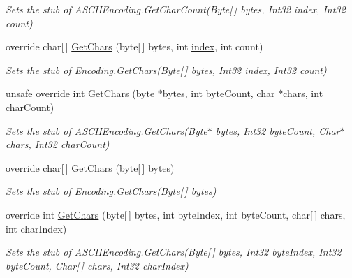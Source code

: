 \begin{DoxyCompactItemize}
\begin{DoxyCompactList}\small\item\em Sets the stub of A\-S\-C\-I\-I\-Encoding.\-Get\-Char\-Count(\-Byte\mbox{[}$\,$\mbox{]} bytes, Int32 index, Int32 count)\end{DoxyCompactList}\item 
override char\mbox{[}$\,$\mbox{]} \hyperlink{class_system_1_1_text_1_1_fakes_1_1_stub_a_s_c_i_i_encoding_a98cc00464ba92346738497208e3e0ed8}{Get\-Chars} (byte\mbox{[}$\,$\mbox{]} bytes, int \hyperlink{jquery-1_810_82-vsdoc_8js_a75bb12d1f23302a9eea93a6d89d0193e}{index}, int count)
\begin{DoxyCompactList}\small\item\em Sets the stub of Encoding.\-Get\-Chars(\-Byte\mbox{[}$\,$\mbox{]} bytes, Int32 index, Int32 count)\end{DoxyCompactList}\item 
unsafe override int \hyperlink{class_system_1_1_text_1_1_fakes_1_1_stub_a_s_c_i_i_encoding_af8360093a4fabc8ceb042e70e77e7f10}{Get\-Chars} (byte $\ast$bytes, int byte\-Count, char $\ast$chars, int char\-Count)
\begin{DoxyCompactList}\small\item\em Sets the stub of A\-S\-C\-I\-I\-Encoding.\-Get\-Chars(\-Byte$\ast$ bytes, Int32 byte\-Count, Char$\ast$ chars, Int32 char\-Count)\end{DoxyCompactList}\item 
override char\mbox{[}$\,$\mbox{]} \hyperlink{class_system_1_1_text_1_1_fakes_1_1_stub_a_s_c_i_i_encoding_ad7f01f405bfa9421b11be2ba091a03ef}{Get\-Chars} (byte\mbox{[}$\,$\mbox{]} bytes)
\begin{DoxyCompactList}\small\item\em Sets the stub of Encoding.\-Get\-Chars(\-Byte\mbox{[}$\,$\mbox{]} bytes)\end{DoxyCompactList}\item 
override int \hyperlink{class_system_1_1_text_1_1_fakes_1_1_stub_a_s_c_i_i_encoding_a7244f25452db59d6ad7d08fe55f73181}{Get\-Chars} (byte\mbox{[}$\,$\mbox{]} bytes, int byte\-Index, int byte\-Count, char\mbox{[}$\,$\mbox{]} chars, int char\-Index)
\begin{DoxyCompactList}\small\item\em Sets the stub of A\-S\-C\-I\-I\-Encoding.\-Get\-Chars(\-Byte\mbox{[}$\,$\mbox{]} bytes, Int32 byte\-Index, Int32 byte\-Count, Char\mbox{[}$\,$\mbox{]} chars, Int32 char\-Index)\end{DoxyCompactList}\item 

\end{DoxyCompactItemize}
